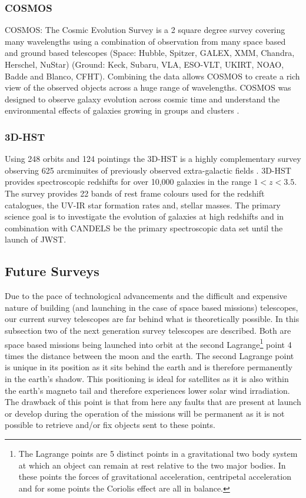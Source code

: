 \subsubsection{COSMOS}

COSMOS: The Cosmic Evolution Survey is a 2 square degree survey covering many wavelengths using a combination of observation from many space based and ground based telescopes (Space: Hubble, Spitzer, GALEX, XMM, Chandra, Herschel, NuStar) (Ground: Keck, Subaru, VLA, ESO-VLT, UKIRT, NOAO, Badde and Blanco, CFHT). Combining the data allows COSMOS to create a rich view of the observed objects across a huge range of wavelengths. COSMOS was designed to observe galaxy evolution across cosmic time and understand the environmental effects of galaxies growing in groups and clusters \citep{HomeCOSMOS}.

\subsubsection{3D-HST}

Using 248 orbits and 124 pointings the 3D-HST is a highly complementary survey observing 625 arcminuites of previously observed extra-galactic fields \citep{Brammer20123D-HST:Telescope}. 3D-HST provides spectroscopic redshifts for over 10,000 galaxies in the range $1 < z < 3.5$. The survey provides 22 bands of rest frame colours used for the redshift catalogues, the UV-IR star formation rates and, stellar masses. The primary science goal is to investigate the evolution of galaxies at high redshifts and in combination with CANDELS be the primary spectroscopic data set until the launch of JWST.

\subsection{Future Surveys}

Due to the pace of technological advancements and the difficult and expensive nature of building (and launching in the case of space based missions) telescopes, our current survey telescopes are far behind what is theoretically possible. In this subsection two of the next generation survey telescopes are described. Both are space based missions being launched into orbit at the second Lagrange\footnote{The Lagrange points are 5 distinct points in a gravitational two body system at which an object can remain at rest relative to the two major bodies. In these points the forces of gravitational acceleration, centripetal acceleration and for some points the Coriolis effect are all in balance.} point 4 times the distance between the moon and the earth. The second Lagrange point is unique in its position as it sits behind the earth and is therefore permanently in the earth's shadow. This positioning is ideal for satellites as it is also within the earth's magneto tail and therefore experiences lower solar wind irradiation. The drawback of this point is that from here any faults that are present at launch or develop during the operation of the missions will be permanent as it is not possible to retrieve and/or fix objects sent to these points.

